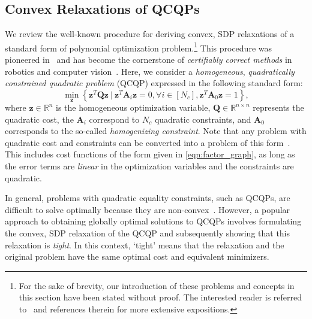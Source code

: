 \documentclass[lettersize,journal]{IEEEtran}
\newcommand{\indset}[1]{\left[#1\right]}
\begin{document}
\subsection{Convex Relaxations of QCQPs}\label{sec:Relaxation}

We review the well-known procedure for deriving convex, SDP relaxations of a standard form of polynomial optimization problem.\footnote{For the sake of brevity, our introduction of these problems and concepts in this section have been stated without proof. The interested reader is referred to~\cite{cifuentesLocalStabilitySemidefinite2022,vandenbergheSemidefiniteProgramming1996} and references therein for more extensive expositions.} This procedure was pioneered in~\cite{shorQuadraticOptimizationProblems1987} and has become the cornerstone of \textit{certifiably correct methods} in robotics and computer vision~\cite{rosenAdvancesInferenceRepresentation2021,brynteTightnessSemidefiniteRelaxations2022}. Here, we consider a \textit{homogeneous}, \textit{quadratically constrained quadratic problem} (QCQP) expressed in the following standard form:
\begin{equation}\label{opt:QCQP}
	\min\limits_{\bm{z}} \left\{ \bm{z}^T\bm{Q}\bm{z} ~\vert~ \bm{z}^T\bm{A}_i\bm{z} = 0,\forall i \in \indset{N_c}, \bm{z}^T\bm{A}_0\bm{z} = 1 \right\},
\end{equation}
where $ \bm{z}\in\mathbb{R}^n $ is the homogeneous optimization variable, $ \bm{Q}\in\mathbb{R}^{n\times n} $ represents the quadratic cost, the $ \bm{A}_i $ correspond to $ N_c $ quadratic constraints, and $ \bm{A}_0 $ corresponds to the so-called \emph{homogenizing constraint}\cite{cifuentesLocalStabilitySemidefinite2022}. Note that any problem with quadratic cost and constraints can be converted into a problem of this form~\cite{cifuentesLocalStabilitySemidefinite2022}. This includes cost functions of the form given in \eqref{eqn:factor_graph}, as long as the error terms are \emph{linear} in the optimization variables and the constraints are quadratic.

In general, problems with quadratic equality constraints, such as QCQPs, are difficult to solve optimally because they are non-convex~\cite{boydConvexOptimization2004}. However, a popular approach to obtaining globally optimal solutions to QCQPs involves formulating the convex, SDP  relaxation of the QCQP and subsequently showing that this relaxation is \emph{tight}. In this context, `tight' means that the relaxation and the original problem have the same optimal cost and equivalent minimizers.
\end{document}
